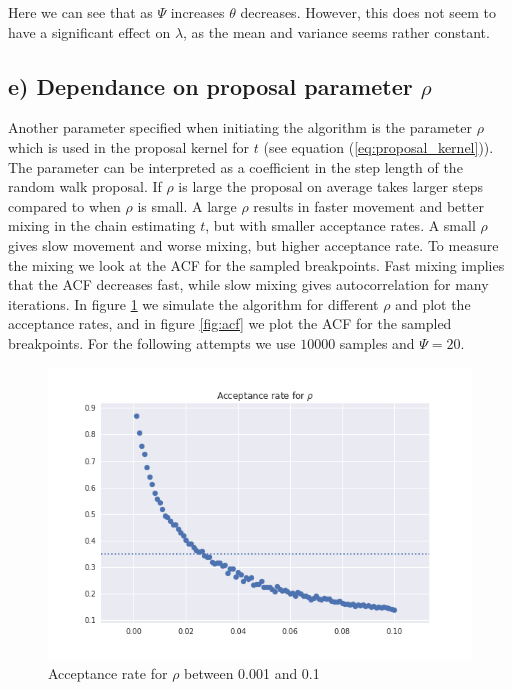 \documentclass[a4paper]{article}
\begin{document}
Here we can see that as $\Psi$ increases $\theta$ decreases. However, this does not seem to have a significant effect on $\lambda$, as the mean and variance seems rather constant.

\subsection*{e) Dependance on proposal parameter $\rho$}
Another parameter specified when initiating the algorithm is the parameter $\rho$ which is used in the proposal kernel for $t$ (see equation (\ref{eq:proposal_kernel})). The parameter can be interpreted as a coefficient in the step length of the random walk proposal. If $\rho$ is large the proposal on average takes larger steps compared to when $\rho$ is small. A large $\rho$ results in faster movement and better mixing in the chain estimating $t$, but with smaller acceptance rates. A small $\rho$ gives slow movement and worse mixing, but higher acceptance rate. To measure the mixing we look at the ACF for the sampled breakpoints. Fast mixing implies that the ACF decreases fast, while slow mixing gives autocorrelation for many iterations. In figure \ref{fig:accept_rho} we simulate the algorithm for different $\rho$ and plot the acceptance rates, and in figure \ref{fig:acf} we plot the ACF for the sampled breakpoints. For the following attempts we use $10 000$ samples and $\Psi = 20$.

\begin{figure}[H]
    \centering
    \includegraphics[width = 1.0\textwidth]{images/accept_rho.png} 
    \caption{Acceptance rate for $\rho$ between 0.001 and 0.1}
    \label{fig:accept_rho}
\end{figure}
\end{document}
